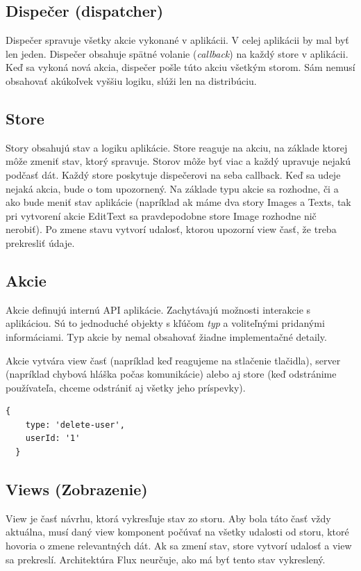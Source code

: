 \subsection{Dispečer (dispatcher)}
Dispečer spravuje všetky akcie vykonané v aplikácii. V celej aplikácii by mal byť len jeden. Dispečer obsahuje spätné volanie (\emph{callback}) na každý store v aplikácii. Keď sa vykoná nová akcia, dispečer pošle túto akciu všetkým storom. Sám nemusí obsahovať akúkoľvek vyššiu logiku, slúži len na distribúciu.

\subsection{Store}
Story obsahujú stav a logiku aplikácie. Store reaguje na akciu, na základe ktorej môže zmeniť stav, ktorý spravuje. Storov môže byť viac a každý upravuje nejakú podčasť dát. Každý store poskytuje dispečerovi na seba callback. Keď sa udeje nejaká akcia, bude o tom upozornený. Na základe typu akcie sa rozhodne, či a ako bude meniť stav aplikácie (napríklad ak máme dva story Images a Texts, tak pri vytvorení akcie EditText sa pravdepodobne store Image rozhodne nič nerobiť). Po zmene stavu vytvorí udalosť, ktorou upozorní view časť, že treba prekresliť údaje.

\subsection{Akcie}
Akcie definujú internú API aplikácie. Zachytávajú možnosti interakcie s aplikáciou. Sú to jednoduché objekty s kľúčom \emph{typ} a voliteľnými pridanými informáciami. Typ akcie by nemal obsahovať žiadne implementačné detaily.

Akcie vytvára view časť (napríklad keď reagujeme na stlačenie tlačidla), server (napríklad chybová hláška počas komunikácie) alebo aj store (keď odstránime používateľa, chceme odstrániť aj všetky jeho príspevky).

\begin{lstlisting}[caption=Akcia vo Flux architektúre]
  {
  	type: 'delete-user',
  	userId: '1'
  }
\end{lstlisting}

\subsection{Views (Zobrazenie)}
View je časť návrhu, ktorá vykresľuje stav zo storu. Aby bola táto časť vždy aktuálna, musí daný view komponent počúvať na všetky udalosti od storu, ktoré hovoria o zmene relevantných dát. Ak sa zmení stav, store vytvorí udalosť a view sa prekreslí. Architektúra Flux neurčuje, ako má byť tento stav vykreslený.

